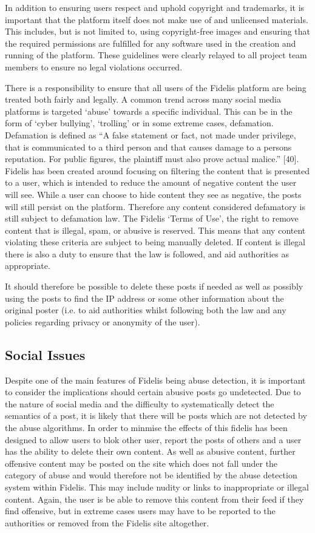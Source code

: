 In addition to ensuring users respect and uphold copyright and trademarks, it is important that the platform itself does not make use of and unlicensed materials. This includes, but is not limited to, using copyright-free images and ensuring that the required permissions are fulfilled for any software used in the creation and running of the platform. These guidelines were clearly relayed to all project team members to ensure no legal violations occurred.

There is a responsibility to ensure that all users of the Fidelis platform are being treated both fairly and legally. A common trend across many social media platforms is targeted `abuse' towards a specific individual. This can be in the form of `cyber bullying', `trolling' or in some extreme cases, defamation. Defamation is defined as ``A false statement or fact, not made under privilege, that is communicated to a third person and that causes damage to a persons reputation. For public figures, the plaintiff must also prove actual malice.'' [40]. Fidelis has been created around focusing on filtering the content that is presented to a user, which is intended to reduce the amount of negative content the user will see. While a user can choose to hide content they see as negative, the posts will still persist on the platform. Therefore any content considered defamatory is still subject to defamation law. The Fidelis `Terms of Use', the right to remove content that is illegal, spam, or abusive is reserved. This means that any content violating these criteria are subject to being manually deleted. If content is illegal there is also a duty to ensure that the law is followed, and aid authorities as appropriate.

It should therefore be possible to delete these posts if needed as well as possibly using the posts to find the IP address or some other information about the original poster (i.e. to aid authorities whilst following both the law and any policies regarding privacy or anonymity of the user).

\subsection{Social Issues}
Despite one of the main features of Fidelis being abuse detection, it is important to consider the implications should certain abusive posts go undetected. Due to the nature of social media and the difficulty to systematically detect the semantics of a post, it is likely that there will be posts which are not detected by the abuse algorithms. In order to minmise the effects of this fidelis has been designed to allow users to blok other user, report the posts of others and a user has the ability to delete their own content. As well as abusive content, further offensive content may be posted on the site which does not fall under the category of abuse and would therefore not be identified by the abuse detection system within Fidelis. This may include nudity or links to inappropriate or illegal content. Again, the user is be able to remove this content from their feed if they find offensive, but in extreme cases users may have to be reported to the authorities or removed from the Fidelis site altogether.

